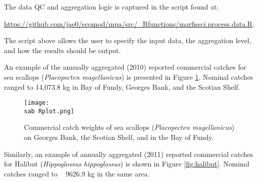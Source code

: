 \documentclass[letterpaper,portrait,11pt]{scrartcl}
\numberwithin{equation}{section}		%
\numberwithin{figure}{section}		%
\numberwithin{table}{section}				%
\newcommand{\ecomod}{\string~/ecomod_data/}   %
\newcommand{\sab}{\ecomod/mpa/sab/}   %
\begin{document}
The data QC and aggregation logic is captured in the script found at: 

\url{https://github.com/jae0/ecomod/mpa/src/\_Rfunctions/marfissci.process.data.R}.

The script above allows the user to specify the input data, the aggregation level, and how the results should be output.

An example of the annually aggregated (2010) reported commercial catches for sea scallops (\textit{Placopecten magellanicus}) is presented in Figure \ref{fig:Scallop}. Nominal catches ranged to 14,073.8  kg in Bay of Fundy, Georges Bank, and the Scotian Shelf.











\begin{figure}[h]
	\centering
 \texttt{[image: \\sab Rplot.png]}
	\caption{Commercial catch weights of sea scallops (\textit{Placopecten magellanicus}) on Georges Bank, the Scotian Shelf, and in the Bay of Fundy.}
		\label{fig:Scallop}
\end{figure}



Similarly, an example of annually aggregated (2011) reported commercial catches for Halibut (\textit{Hippoglossus hippoglossus}) is shown in Figure \ref{fig:halibut}.  Nominal catches ranged to ~ 9626.9 kg in the same area.
\end{document}
